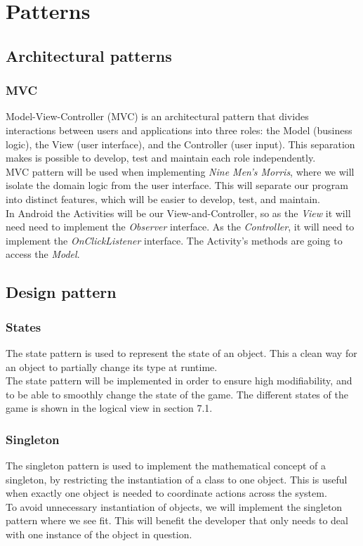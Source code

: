 \section{Patterns}

\subsection{Architectural patterns}

\subsubsection{MVC}
Model-View-Controller (MVC) is an architectural pattern that divides interactions between users and applications into three roles: the Model (business logic), the View (user interface), and the Controller (user input). This separation makes is possible to develop, test and maintain each role independently. \\

MVC pattern will be used when implementing \emph{Nine Men’s Morris}, where we will isolate the domain logic from the user interface. This will separate our program into distinct features, which will be easier to develop, test, and maintain. \\

In Android the Activities will be our View-and-Controller, so as the \emph{View} it will need need to implement the \emph{Observer} interface. As the \emph{Controller}, it will need to implement the \emph{OnClickListener} interface. The Activity’s methods are going to access the \emph{Model}.

\subsection{Design pattern}
\subsubsection{States}
The state pattern is used to represent the state of an object. This a clean way for an object to partially change its type at runtime. \\

The state pattern will be implemented in order to ensure high modifiability, and to be able to smoothly change the state of the game. The different states of the game is shown in the logical view in section 7.1.

\subsubsection{Singleton}
The singleton pattern is used to implement the mathematical concept of a singleton, by restricting the instantiation of a class to one object. This is useful when exactly one object is needed to coordinate actions across the system. \\

To avoid unnecessary instantiation of objects, we will implement the singleton pattern where we see fit. This will benefit the developer that only needs to deal with one instance of the object in question.




